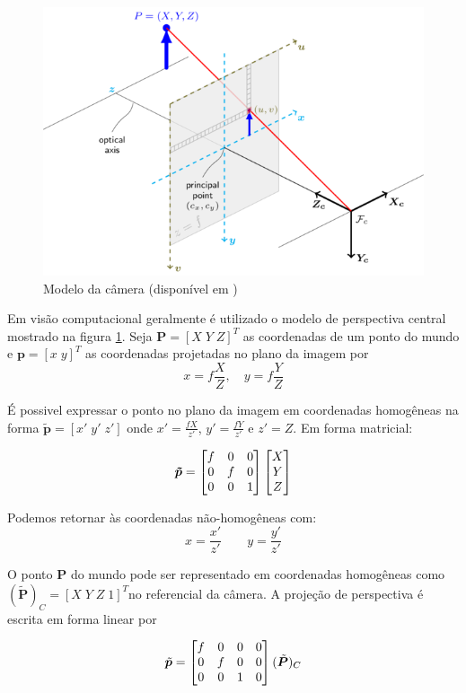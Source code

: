\begin{figure}[h!]
  \centering
  \includegraphics[width=0.8\linewidth]{./img/camera_model2.png}
  \caption{}
\label{fig:camera_model}
\caption{Modelo da câmera (disponível em \cite{opencvCameraCalibration})}
\end{figure}

Em visão computacional geralmente é utilizado o modelo de perspectiva central mostrado na figura \ref{fig:camera_model}.
Seja $\bm{P} = [X\; Y\; Z]^T$ as coordenadas de um ponto do mundo e $\bm{p} = [x\;y]^T$ as coordenadas projetadas no plano da imagem por
\begin{equation}
x = f \frac{X}{Z}, \quad y = f \frac{Y}{Z}
\end{equation}

É possivel expressar o ponto no plano da imagem em coordenadas homogêneas na forma $\tilde{\bm{p}} = [x'\; y' \; z']$ onde $x' = \frac{fX}{z'}$, $y' = \frac{fY}{z'}$ e $z' = Z$. Em forma matricial:

\begin{equation}
\bm{\tilde{p}} = 
\begin{bmatrix} f & 0 & 0 \\
	 0 & f & 0 \\
	 0 & 0 & 1	
\end{bmatrix}
\begin{bmatrix}X\\Y\\Z\end{bmatrix}
\end{equation}

Podemos retornar às coordenadas não-homogêneas com:
\[ x = \frac{x'}{z'} \qquad y = \frac{y'}{z'}\]

O ponto $\bm{P}$ do mundo pode ser representado em coordenadas homogêneas como $(\bm{\tilde{P}})_C = [X \; Y \; Z \; 1]^T$no referencial da câmera. A projeção de perspectiva é escrita em forma linear por 

\begin{equation} \label{eq:projpersp}
\tilde{\bm{p}} = \begin{bmatrix}
    f & 0 & 0 & 0 \\
    0 & f & 0 & 0 \\
    0 & 0 & 1 & 0
\end{bmatrix} (\tilde{\bm{P}})_C
\end{equation}


